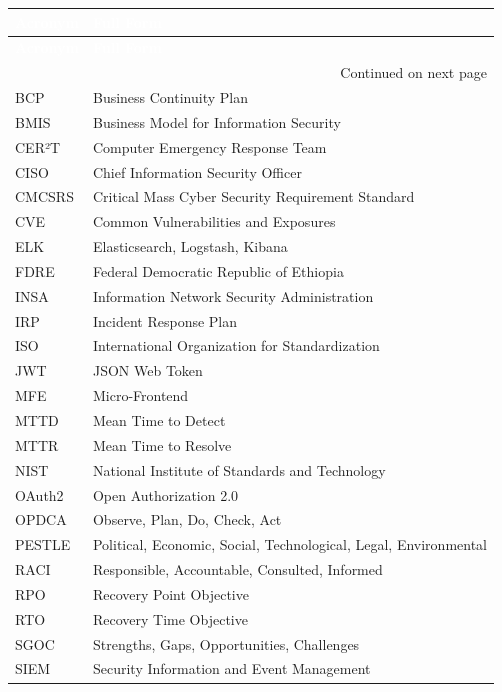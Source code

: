 \begin{center}
\begin{longtable}{|p{}|p{}|}
\hline
\rowcolor{mooveblue}
\textcolor{white}{\textbf{Acronym}} & \textcolor{white}{\textbf{Full Form}} \\
\hline
\endfirsthead
\hline
\rowcolor{mooveblue}
\textcolor{white}{\textbf{Acronym}} & \textcolor{white}{\textbf{Full Form}} \\
\hline
\endhead
\hline
\multicolumn{2}{|r|}{Continued on next page} \\
\hline
\endfoot
\hline
\endlastfoot
BCP & Business Continuity Plan \\
BMIS & Business Model for Information Security \\
CER²T & Computer Emergency Response Team \\
CISO & Chief Information Security Officer \\
CMCSRS & Critical Mass Cyber Security Requirement Standard \\
CVE & Common Vulnerabilities and Exposures \\
ELK & Elasticsearch, Logstash, Kibana \\
FDRE & Federal Democratic Republic of Ethiopia \\
INSA & Information Network Security Administration \\
IRP & Incident Response Plan \\
ISO & International Organization for Standardization \\
JWT & JSON Web Token \\
MFE & Micro-Frontend \\
MTTD & Mean Time to Detect \\
MTTR & Mean Time to Resolve \\
NIST & National Institute of Standards and Technology \\
OAuth2 & Open Authorization 2.0 \\
OPDCA & Observe, Plan, Do, Check, Act \\
PESTLE & Political, Economic, Social, Technological, Legal, Environmental \\
RACI & Responsible, Accountable, Consulted, Informed \\
RPO & Recovery Point Objective \\
RTO & Recovery Time Objective \\
SGOC & Strengths, Gaps, Opportunities, Challenges \\
SIEM & Security Information and Event Management \\
\hline
\end{longtable}
\end{center}
\newpage

